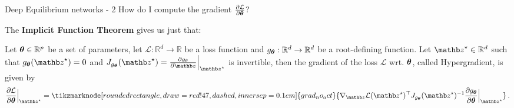 \begin{frame}{Deep Equilibrium networks - 2}
    How do I compute the gradient $\frac{\partial \mathcal{L}}{\partial {\ensuremath{\boldsymbol{\theta}}}}$?
    \pause

    The \textbf{Implicit Function Theorem} gives us just that:
    \begin{theorem}
        Let ${\boldsymbol{\theta}} \in \mathbb{R}^p$ be a set of parameters, let $\mathcal{L}: \mathbb{R}^d \rightarrow \mathbb{R}$ be a loss function and $g_{{\boldsymbol{\theta}}}: \mathbb{R}^d \rightarrow \mathbb{R}^d$ be a root-defining function.
Let $\zb^\star \in  \mathbb{R}^d$ such that $g_{\thetab}(\zb^\star) = 0$ and $J_{g_{\thetab}}(\zb^\star) = \frac{\partial g_{\theta}}{\partial \zb}\Bigr|_{\zb^\star}$ is invertible, then the gradient of the loss $\mathcal{L}$ wrt. ${\boldsymbol{\theta}}$, called Hypergradient, is given by
\begin{equation*}
    \frac{\partial \mathcal{L}}{\partial \thetab}\Bigr|_{\zb^\star} = \tikzmarknode[rounded rectangle, draw=red!47, dashed, inner sep=0.1em]{grad_no_act}{\nabla_\zb \mathcal{L}(\zb^\star)^\top J_{g_{\thetab}}(\zb^\star)^{-1} \frac{\partial g_{\thetab}}{\partial \thetab}\Bigr|_{\zb^\star}} \, .
\end{equation*}
    \end{theorem}
\end{frame}

